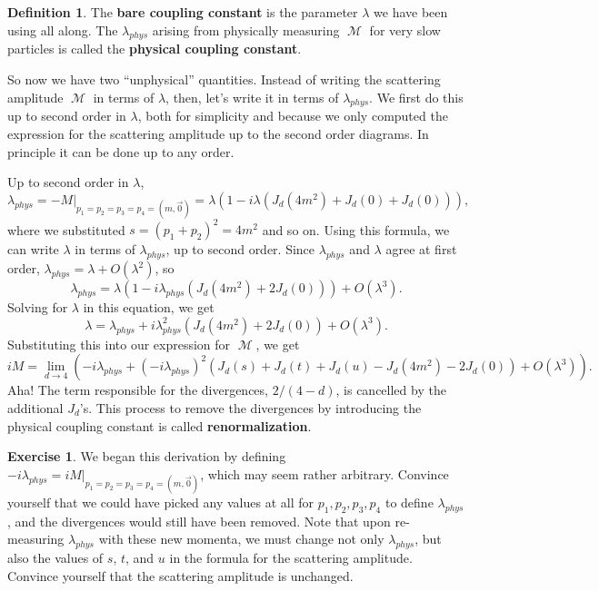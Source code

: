 \documentclass{report}
\theoremstyle{plain}
\theoremstyle{definition}
\newtheorem{definition}[theorem]{Definition}
\newtheorem{exercise}{Exercise}[section]
\theoremstyle{remark}
\DeclareMathOperator{\cM}{\mathcal{M}}
\begin{document}
\begin{definition}
  The {\bf bare coupling constant} is the parameter $\lambda$ we have
  been using all along. The $\lambda_{phys}$ arising from physically
  measuring $\cM$ for very slow particles is called the {\bf physical
    coupling constant}.
\end{definition}

So now we have two ``unphysical'' quantities. Instead of writing the
scattering amplitude $\cM$ in terms of $\lambda$, then, let's write it
in terms of $\lambda_{phys}$. We first do this up to second order in
$\lambda$, both for simplicity and because we only computed the
expression for the scattering amplitude up to the second order
diagrams. In principle it can be done up to any order.

Up to second order in $\lambda$, 
$$ \lambda_{phys} = -M|_{p_1=p_2=p_3=p_4=(m,\vec{0})} = \lambda\left(1 - i\lambda(J_d(4m^2) + J_d(0) + J_d(0))\right), $$
where we substituted $s = (p_1 + p_2)^2 = 4m^2$ and so on. Using this
formula, we can write $\lambda$ in terms of $\lambda_{phys}$, up to
second order. Since $\lambda_{phys}$ and $\lambda$ agree at first
order, $\lambda_{phys} = \lambda + O(\lambda^2)$, so
$$ \lambda_{phys} = \lambda\left(1 - i\lambda_{phys}(J_d(4m^2) + 2J_d(0))\right) + O(\lambda^3). $$
Solving for $\lambda$ in this equation, we get
$$ \lambda = \lambda_{phys} + i\lambda_{phys}^2(J_d(4m^2) + 2J_d(0)) + O(\lambda^3). $$
Substituting this into our expression for $\cM$, we get
$$ iM = \lim_{d \to 4} \left(-i\lambda_{phys} + (-i\lambda_{phys})^2(J_d(s) + J_d(t) + J_d(u) - J_d(4m^2) - 2J_d(0)) + O(\lambda^3) \right). $$
Aha! The term responsible for the divergences, $2/(4-d)$, is cancelled
by the additional $J_d$'s. This process to remove the divergences by
introducing the physical coupling constant is called {\bf
  renormalization}.

\begin{exercise}
  We began this derivation by defining
  $-i\lambda_{phys} = iM|_{p_1=p_2=p_3=p_4=(m,\vec{0})}$, which may
  seem rather arbitrary. Convince yourself that we could have picked
  any values at all for $p_1, p_2, p_3, p_4$ to define
  $\lambda_{phys}$, and the divergences would still have been removed.
  Note that upon re-measuring $\lambda_{phys}$ with these new momenta,
  we must change not only $\lambda_{phys}$, but also the values of
  $s$, $t$, and $u$ in the formula for the scattering amplitude.
  Convince yourself that the scattering amplitude is unchanged.
\end{exercise}
\end{document}
